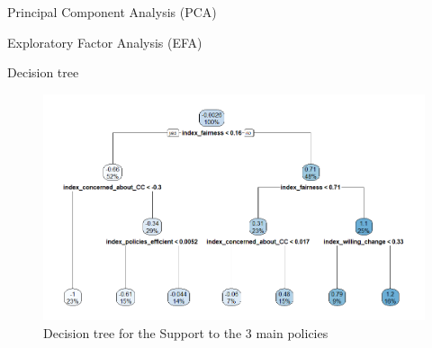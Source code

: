 % 

\begin{frame}{Principal Component Analysis (PCA)}

\end{frame}

\begin{frame}{Exploratory Factor Analysis (EFA)}

\end{frame}

\begin{frame}{Decision tree}
	\begin{figure}
		\caption{Decision tree for the Support to the 3 main policies}
		\includegraphics[height=.85\textheight]{../../figures/all/tree_main_policies.png}		
	\end{figure}
\end{frame}
	


